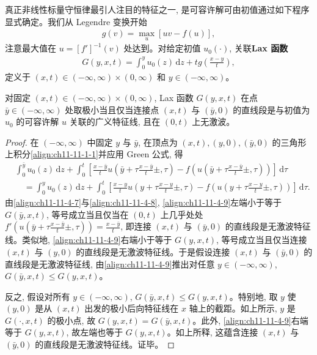\documentclass[../../main.tex]{subfiles}
\begin{document}
真正非线性标量守恒律最引人注目的特征之一, 是可容许解可由初值通过如下程序显式确定。我们从 Legendre 变换开始
\begin{align}
g(v)=\max_u[uv-f(u)],\label{align:ch11-11-4-7}
\end{align}
注意最大值在 $u=[f']^{-1}(v)$ 处达到。对给定初值 $u_0(\cdot)$, 关联\textbf{Lax 函数}
\begin{align}
G(y,x,t)=\int_0^y u_0(z)\,\mathrm{d}z+tg\left(\frac{x-y}{t}\right),\label{align:ch11-11-4-8}
\end{align}
定义于 $(x,t)\in(-\infty,\infty)\times(0,\infty)$ 和 $y\in(-\infty,\infty)$。

\begin{theorem}\label{theorem:ch11-11-4-3}
对固定 $(x,t)\in(-\infty,\infty)\times(0,\infty)$, Lax 函数 $G(y,x,t)$ 在点 $\bar y\in(-\infty,\infty)$ 处取极小当且仅当连接点 $(x,t)$ 与 $(\bar y,0)$ 的直线段是与初值为 $u_0$ 的可容许解 $u$ 关联的广义特征线, 且在 $(0,t)$ 上无激波。
\end{theorem}

\begin{proof}
在 $(-\infty,\infty)$ 中固定 $y$ 与 $\bar y$, 在顶点为 $(x,t),(y,0),(\bar y,0)$ 的三角形上积分\eqref{align:ch11-11-1-1}并应用 Green 公式, 得
\begin{align}
&\int_0^{\bar y}u_0(z)\,\mathrm{d}z+\int_0^t\left[\frac{x-\bar y}{t}u\left(\bar y+\tau\frac{x-\bar y}{t}\pm,\tau\right)-f\left(u\left(\bar y+\tau\frac{x-\bar y}{t}\pm,\tau\right)\right)\right]\,\mathrm{d}\tau\nonumber\\
&\quad=\int_0^y u_0(z)\,\mathrm{d}z+\int_0^t\left[\frac{x-y}{t}u\left(y+\tau\frac{x-y}{t}\pm,\tau\right)-f\left(u\left(y+\tau\frac{x-y}{t}\pm,\tau\right)\right)\right]\,\mathrm{d}\tau.\label{align:ch11-11-4-9}
\end{align}
由\eqref{align:ch11-11-4-7}与\eqref{align:ch11-11-4-8}, \eqref{align:ch11-11-4-9}左端小于等于 $G(\bar y,x,t)$, 等号成立当且仅当在 $(0,t)$ 上几乎处处 $f'(u(\bar y+\tau\frac{x-\bar y}{t}\pm,\tau))=\frac{x-\bar y}{t}$, 即连接 $(x,t)$ 与 $(\bar y,0)$ 的直线段是无激波特征线。类似地, \eqref{align:ch11-11-4-9}右端小于等于 $G(y,x,t)$, 等号成立当且仅当连接 $(x,t)$ 与 $(y,0)$ 的直线段是无激波特征线。于是假设连接 $(x,t)$ 与 $(\bar y,0)$ 的直线段是无激波特征线, 由\eqref{align:ch11-11-4-9}推出对任意 $y\in(-\infty,\infty)$, $G(\bar y,x,t)\leqslant G(y,x,t)$。

反之, 假设对所有 $y\in(-\infty,\infty)$, $G(\bar y,x,t)\leqslant G(y,x,t)$。特别地, 取 $y$ 使 $(y,0)$ 是从 $(x,t)$ 出发的极小后向特征线在 $x$ 轴上的截距。如上所示, $y$ 是 $G(\cdot,x,t)$ 的极小点, 故 $G(y,x,t)=G(\bar y,x,t)$。此外, \eqref{align:ch11-11-4-9}右端等于 $G(y,x,t)$, 故左端也等于 $G(y,x,t)$。如上所释, 这蕴含连接 $(x,t)$ 与 $(\bar y,0)$ 的直线段是无激波特征线。证毕。
\end{proof}
\end{document}
